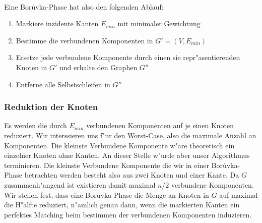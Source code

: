 \\
Eine Bor\r uvka-Phase hat also den folgenden Ablauf:
\begin{enumerate}
    \item Markiere inzidente Kanten $E_{min}$ mit minimaler Gewichtung
    \item Bestimme die verbundenen Komponenten in $G' = (V,E_{min})$
    \item Ersetze jede verbundene Komponente durch einen sie repr"asentierenden
          Knoten in $G'$ und erhalte den Graphen $G''$
    \item Entferne alle Selbstschleifen in $G''$
\end{enumerate}

\subsubsection{Reduktion der Knoten}
Es werden die durch $E_{min}$ verbundenen Komponenten auf je einen Knoten 
    reduziert.
    Wir interssieren uns f"ur den Worst-Case, also die maximale Anzahl an 
    Komponenten.
    Die kleinste Verbundene Komponente w"are theoretisch ein
    einzelner Knoten ohne Kanten.
    An dieser Stelle w"urde aber unser Algorithmus terminieren.
    Die kleinste Verbundene Komponente die wir in einer Bor\r uvka-Phase 
    betrachten werden besteht also aus zwei Knoten und einer Kante.
    Da $G$ zusammenh"angend ist existieren damit maximal $n/2$ verbundene
    Komponenten.\\
Wir stellen fest, dass eine Bor\r uvka-Phase die Menge an Knoten in $G$ auf 
    maximal die H"alfte reduziert, n"amlich genau dann, wenn die markierten 
    Kanten ein perfektes Matching beim bestimmen der verbundenen Komponenten
    induzieren.\\
